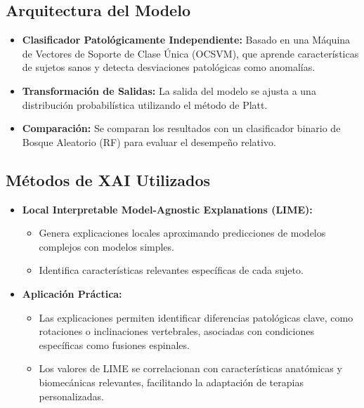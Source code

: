 \documentclass{report}
\begin{document}
\subsection{Arquitectura del Modelo}
\begin{itemize}
    \item \textbf{Clasificador Patológicamente Independiente:} Basado en una Máquina de Vectores de Soporte de Clase Única (OCSVM), que aprende características de sujetos sanos y detecta desviaciones patológicas como anomalías.
    \item \textbf{Transformación de Salidas:} La salida del modelo se ajusta a una distribución probabilística utilizando el método de Platt.
    \item \textbf{Comparación:} Se comparan los resultados con un clasificador binario de Bosque Aleatorio (RF) para evaluar el desempeño relativo.
\end{itemize}

\subsection{Métodos de XAI Utilizados}
\begin{itemize}
    \item \textbf{Local Interpretable Model-Agnostic Explanations (LIME):}
    \begin{itemize}
        \item Genera explicaciones locales aproximando predicciones de modelos complejos con modelos simples.
        \item Identifica características relevantes específicas de cada sujeto.
    \end{itemize}
    \item \textbf{Aplicación Práctica:}
    \begin{itemize}
        \item Las explicaciones permiten identificar diferencias patológicas clave, como rotaciones o inclinaciones vertebrales, asociadas con condiciones específicas como fusiones espinales.
        \item Los valores de LIME se correlacionan con características anatómicas y biomecánicas relevantes, facilitando la adaptación de terapias personalizadas.
    \end{itemize}
\end{itemize}
\end{document}
